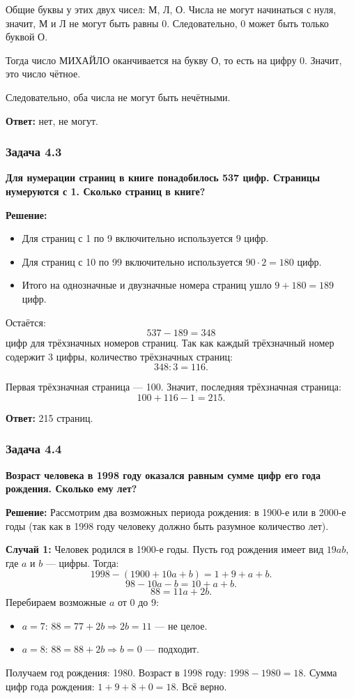 \documentclass[12pt, a4paper]{article}
\begin{document}
Общие буквы у этих двух чисел: М, Л, О. Числа не могут начинаться с нуля, значит, М и Л не могут быть равны 0. Следовательно, 0 может быть только буквой О.

Тогда число МИХАЙЛО оканчивается на букву О, то есть на цифру 0. Значит, это число чётное.

Следовательно, оба числа не могут быть нечётными.

\textbf{Ответ:} нет, не могут.

\subsubsection*{Задача 4.3}
\textbf{Для нумерации страниц в книге понадобилось 537 цифр. Страницы нумеруются с 1. Сколько страниц в книге?}

\textbf{Решение:}
\begin{itemize}
    \item Для страниц с 1 по 9 включительно используется $9$ цифр.
    \item Для страниц с 10 по 99 включительно используется $90 \cdot 2 = 180$ цифр.
    \item Итого на однозначные и двузначные номера страниц ушло $9 + 180 = 189$ цифр.
\end{itemize}

Остаётся:
\[
537 - 189 = 348
\]
цифр для трёхзначных номеров страниц. Так как каждый трёхзначный номер содержит 3 цифры, количество трёхзначных страниц:
\[
348 : 3 = 116.
\]

Первая трёхзначная страница — 100. Значит, последняя трёхзначная страница:
\[
100 + 116 - 1 = 215.
\]

\textbf{Ответ:} 215 страниц.

\subsubsection*{Задача 4.4}
\textbf{Возраст человека в 1998 году оказался равным сумме цифр его года рождения. Сколько ему лет?}

\textbf{Решение:}
Рассмотрим два возможных периода рождения: в 1900-е или в 2000-е годы (так как в 1998 году человеку должно быть разумное количество лет).

\textbf{Случай 1:} Человек родился в 1900-е годы. Пусть год рождения имеет вид $19ab$, где $a$ и $b$ — цифры. Тогда:
\[
1998 - (1900 + 10a + b) = 1 + 9 + a + b.
\]
\[
98 - 10a - b = 10 + a + b.
\]
\[
88 = 11a + 2b.
\]
Перебираем возможные $a$ от 0 до 9:
\begin{itemize}
    \item $a = 7$: $88 = 77 + 2b \Rightarrow 2b = 11$ — не целое.
    \item $a = 8$: $88 = 88 + 2b \Rightarrow b = 0$ — подходит.
\end{itemize}
Получаем год рождения: 1980. Возраст в 1998 году: $1998 - 1980 = 18$. Сумма цифр года рождения: $1 + 9 + 8 + 0 = 18$. Всё верно.
\end{document}
